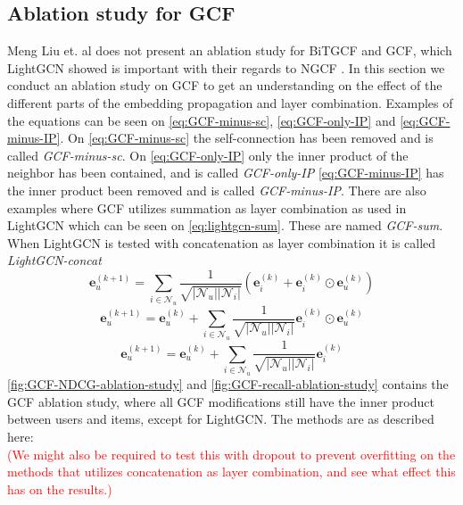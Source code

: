 \subsection{Ablation study for GCF}
Meng Liu et. al does not present an ablation study for BiTGCF and GCF, which LightGCN showed is important with their regards to NGCF \cite{lightgcn,BiTGCF}.
In this section we conduct an ablation study on GCF to get an understanding on the effect of the different parts of the embedding propagation and layer combination.
Examples of the equations can be seen on \autoref{eq:GCF-minus-sc}, \autoref{eq:GCF-only-IP} and \autoref{eq:GCF-minus-IP}.
On \autoref{eq:GCF-minus-sc} the self-connection has been removed and is called \textit{GCF-minus-sc}. 
On \autoref{eq:GCF-only-IP} only the inner product of the neighbor has been contained, and is called \textit{GCF-only-IP}
\autoref{eq:GCF-minus-IP} has the inner product been removed and is called \textit{GCF-minus-IP}.
There are also examples where GCF utilizes summation as layer combination as used in LightGCN which can be seen on \autoref{eq:lightgcn-sum}.
These are named \textit{GCF-sum}.
When LightGCN is tested with concatenation as layer combination it is called \textit{LightGCN-concat}
\begin{equation}
    \mathbf{e}_{u}^{(k+1)} = \sum^{}_{i \in \mathcal{N}_u}  \frac{1}{\sqrt{|\mathcal{N}_u||\mathcal{N}_i|}}\left( \mathbf{e}_i^{(k)} + \mathbf{e}_i^{(k)} \odot \mathbf{e}_u^{(k)} \right)
    \label{eq:GCF-minus-sc}
\end{equation}
\begin{equation}
    \mathbf{e}_{u}^{(k+1)} = \mathbf{e}_{u}^{(k)} + \sum^{}_{i \in \mathcal{N}_u}  \frac{1}{\sqrt{|\mathcal{N}_u||\mathcal{N}_i|}} \mathbf{e}_i^{(k)} \odot \mathbf{e}_u^{(k)} 
    \label{eq:GCF-only-IP}
\end{equation}
\begin{equation}
    \mathbf{e}_{u}^{(k+1)} = \mathbf{e}_{u}^{(k)} + \sum^{}_{i \in \mathcal{N}_u}  \frac{1}{\sqrt{|\mathcal{N}_u||\mathcal{N}_i|}} \mathbf{e}_i^{(k)} 
    \label{eq:GCF-minus-IP}
\end{equation}
\autoref{fig:GCF-NDCG-ablation-study} and \autoref{fig:GCF-recall-ablation-study} contains the GCF ablation study, where all GCF modifications still have the inner product between users and items, except for LightGCN.
The methods are as described here:\\
\textcolor{red}{(We might also be required to test this with dropout to prevent overfitting on the methods that utilizes concatenation as layer combination, and see what effect this has on the results.)}
